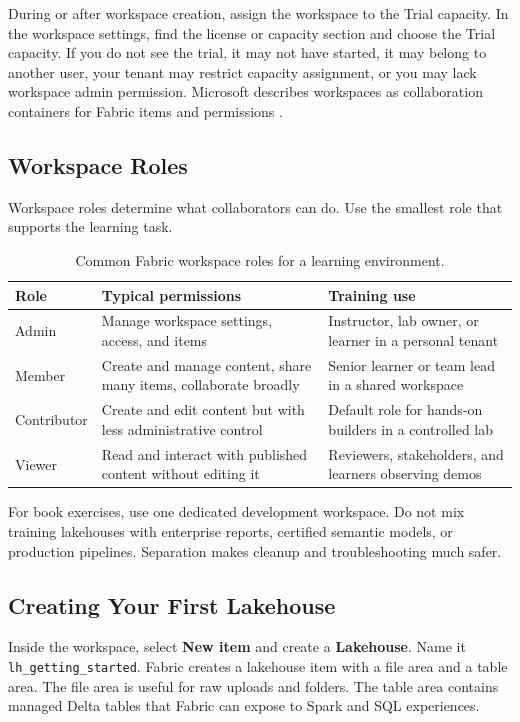 During or after workspace creation, assign the workspace to the Trial capacity. In the workspace settings, find the license or capacity section and choose the Trial capacity. If you do not see the trial, it may not have started, it may belong to another user, your tenant may restrict capacity assignment, or you may lack workspace admin permission. Microsoft describes workspaces as collaboration containers for Fabric items and permissions \cite{microsoftFabricWorkspaces}.

\subsection{Workspace Roles}
Workspace roles determine what collaborators can do. Use the smallest role that supports the learning task.

\begin{table}[H]
\centering
\small
\begin{tabular}{@{}p{3.0cm}p{5.2cm}p{5.0cm}@{}}
\toprule
\textbf{Role} & \textbf{Typical permissions} & \textbf{Training use} \\
\midrule
Admin & Manage workspace settings, access, and items & Instructor, lab owner, or learner in a personal tenant \\
Member & Create and manage content, share many items, collaborate broadly & Senior learner or team lead in a shared workspace \\
Contributor & Create and edit content but with less administrative control & Default role for hands-on builders in a controlled lab \\
Viewer & Read and interact with published content without editing it & Reviewers, stakeholders, and learners observing demos \\
\bottomrule
\end{tabular}
\caption{Common Fabric workspace roles for a learning environment.}
\label{tab:chapter0-workspace-roles}
\end{table}

\begin{tipbox}
For book exercises, use one dedicated development workspace. Do not mix training lakehouses with enterprise reports, certified semantic models, or production pipelines. Separation makes cleanup and troubleshooting much safer.
\end{tipbox}

\subsection{Creating Your First Lakehouse}
Inside the workspace, select \textbf{New item} and create a \textbf{Lakehouse}. Name it \texttt{lh\_getting\_started}. Fabric creates a lakehouse item with a file area and a table area. The file area is useful for raw uploads and folders. The table area contains managed Delta tables that Fabric can expose to Spark and SQL experiences.


